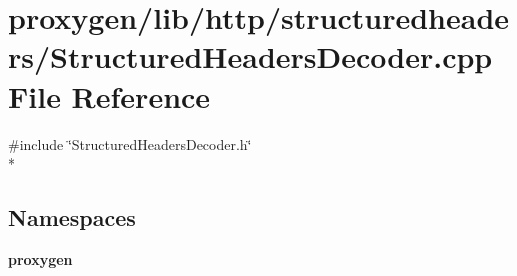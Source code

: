 \section{proxygen/lib/http/structuredheaders/\+Structured\+Headers\+Decoder.cpp File Reference}
\label{StructuredHeadersDecoder_8cpp}
{\ttfamily \#include \char`\"{}Structured\+Headers\+Decoder.\+h\char`\"{}}\\*
\subsection*{Namespaces}
\begin{DoxyCompactItemize}
\item 
 {\bf proxygen}
\end{DoxyCompactItemize}
